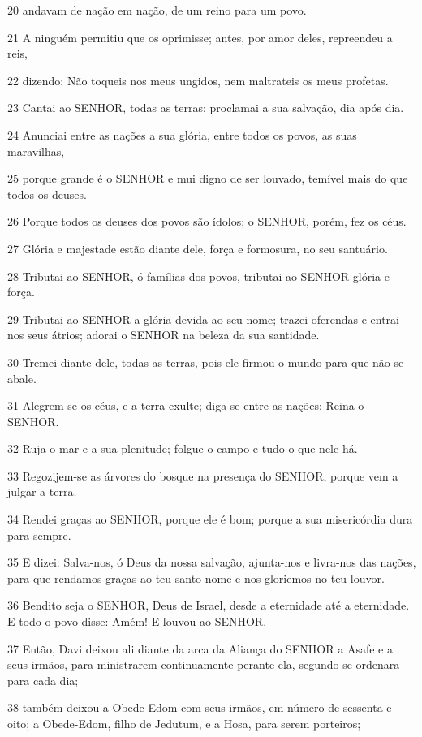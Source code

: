 \par 20 andavam de nação em nação, de um reino para um povo.
\par 21 A ninguém permitiu que os oprimisse; antes, por amor deles, repreendeu a reis,
\par 22 dizendo: Não toqueis nos meus ungidos, nem maltrateis os meus profetas.
\par 23 Cantai ao SENHOR, todas as terras; proclamai a sua salvação, dia após dia.
\par 24 Anunciai entre as nações a sua glória, entre todos os povos, as suas maravilhas,
\par 25 porque grande é o SENHOR e mui digno de ser louvado, temível mais do que todos os deuses.
\par 26 Porque todos os deuses dos povos são ídolos; o SENHOR, porém, fez os céus.
\par 27 Glória e majestade estão diante dele, força e formosura, no seu santuário.
\par 28 Tributai ao SENHOR, ó famílias dos povos, tributai ao SENHOR glória e força.
\par 29 Tributai ao SENHOR a glória devida ao seu nome; trazei oferendas e entrai nos seus átrios; adorai o SENHOR na beleza da sua santidade.
\par 30 Tremei diante dele, todas as terras, pois ele firmou o mundo para que não se abale.
\par 31 Alegrem-se os céus, e a terra exulte; diga-se entre as nações: Reina o SENHOR.
\par 32 Ruja o mar e a sua plenitude; folgue o campo e tudo o que nele há.
\par 33 Regozijem-se as árvores do bosque na presença do SENHOR, porque vem a julgar a terra.
\par 34 Rendei graças ao SENHOR, porque ele é bom; porque a sua misericórdia dura para sempre.
\par 35 E dizei: Salva-nos, ó Deus da nossa salvação, ajunta-nos e livra-nos das nações, para que rendamos graças ao teu santo nome e nos gloriemos no teu louvor.
\par 36 Bendito seja o SENHOR, Deus de Israel, desde a eternidade até a eternidade. E todo o povo disse: Amém! E louvou ao SENHOR.
\par 37 Então, Davi deixou ali diante da arca da Aliança do SENHOR a Asafe e a seus irmãos, para ministrarem continuamente perante ela, segundo se ordenara para cada dia;
\par 38 também deixou a Obede-Edom com seus irmãos, em número de sessenta e oito; a Obede-Edom, filho de Jedutum, e a Hosa, para serem porteiros;

